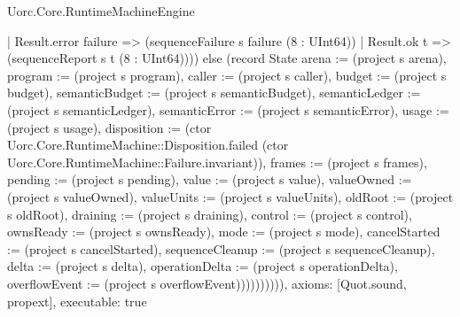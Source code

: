 \begin{lexlean}{Uorc.Core.RuntimeMachineEngine}
\begin{semanticmodule}
{          | Result.error failure => (sequenceFailure s failure (8 : UInt64))
          | Result.ok t => (sequenceReport s t (8 : UInt64)))) else (record State {arena := (project s arena), program := (project s program), caller := (project s caller), budget := (project s budget), semanticBudget := (project s semanticBudget), semanticLedger := (project s semanticLedger), semanticError := (project s semanticError), usage := (project s usage), disposition := (ctor Uorc.Core.RuntimeMachine::Disposition.failed (ctor Uorc.Core.RuntimeMachine::Failure.invariant)), frames := (project s frames), pending := (project s pending), value := (project s value), valueOwned := (project s valueOwned), valueUnits := (project s valueUnits), oldRoot := (project s oldRoot), draining := (project s draining), control := (project s control), ownsReady := (project s ownsReady), mode := (project s mode), cancelStarted := (project s cancelStarted), sequenceCleanup := (project s sequenceCleanup), delta := (project s delta), operationDelta := (project s operationDelta), overflowEvent := (project s overflowEvent)}))))))))),
  axioms: [Quot.sound, propext],
  executable: true
}


\end{semanticmodule}
\end{lexlean}
